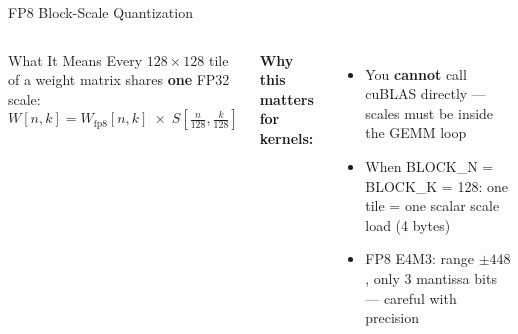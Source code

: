 \begin{frame}{FP8 Block-Scale Quantization}
\begin{columns}[T]
\begin{block}{What It Means}
\small
Every $128\times128$ tile of a weight matrix shares \textbf{one} FP32 scale:
\[
W[n,k] = W_\text{fp8}[n,k]\;\times\;S\!\left[\tfrac{n}{128},\tfrac{k}{128}\right]
\]
\end{block}
\smallskip
\textbf{\small Why this matters for kernels:}
\begin{itemize}\small
  \item You \textbf{cannot} call cuBLAS directly --- scales must be inside the GEMM loop
  \item When BLOCK\_N = BLOCK\_K = 128: one tile = one scalar scale load (4 bytes)
  \item FP8 E4M3: range $\pm448$, only 3 mantissa bits --- careful with precision
\end{itemize}

\end{columns}
\end{frame}

